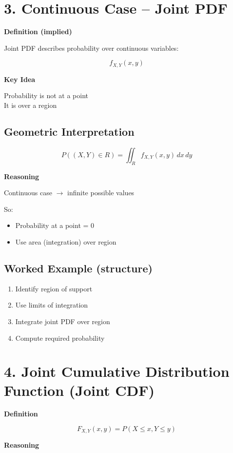 \documentclass[12pt]{article}
\begin{document}
\section*{3. Continuous Case -- Joint PDF}

\textbf{Definition (implied)}

Joint PDF describes probability over continuous variables:

\[
f_{X,Y}(x,y)
\]

\textbf{Key Idea}

Probability is not at a point \\
It is over a region

\subsection*{Geometric Interpretation}

\[
P((X,Y) \in R) = \iint_R f_{X,Y}(x,y)\,dx\,dy
\]

\textbf{Reasoning}

Continuous case $\rightarrow$ infinite possible values

So:
\begin{itemize}
\item Probability at a point = 0
\item Use area (integration) over region
\end{itemize}

\subsection*{Worked Example (structure)}

\begin{enumerate}
\item Identify region of support
\item Use limits of integration
\item Integrate joint PDF over region
\item Compute required probability
\end{enumerate}

\section*{4. Joint Cumulative Distribution Function (Joint CDF)}

\textbf{Definition}

\[
F_{X,Y}(x,y) = P(X \le x, Y \le y)
\]

\textbf{Reasoning}
\end{document}
